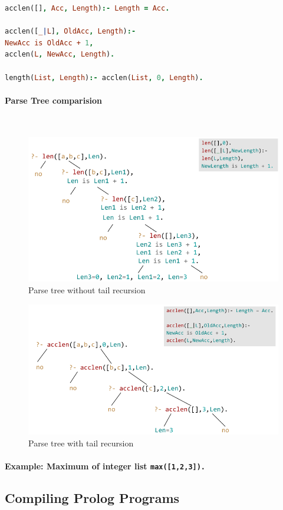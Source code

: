 \begin{lstlisting}[language=Prolog]
acclen([], Acc, Length):- Length = Acc.

acclen([_|L], OldAcc, Length):-
NewAcc is OldAcc + 1,
acclen(L, NewAcc, Length).

length(List, Length):- acclen(List, 0, Length).
\end{lstlisting}

\paragraph{Parse Tree comparision} \hfill \\

\begin{figure}[h]
	\centering
	\includegraphics[width=0.5\linewidth]{images/parse_tree_acclen_2}
	\caption{Parse tree without tail recursion}
	\label{fig:parsetreeacclen2}
\end{figure}

\begin{figure}[h]
\centering
\includegraphics[width=0.5\linewidth]{images/parse_tree_acclen_tail_recursion}
\caption{Parse tree with tail recursion}
\label{fig:parsetreeacclentailrecursion}
\end{figure}

\paragraph{Example: Maximum of integer list \lstinline|max([1,2,3]).|}


\subsection{Compiling Prolog Programs}

